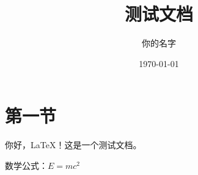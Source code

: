 \documentclass{article}
\begin{document}
\title{测试文档}
\author{你的名字}
\date{\today}
\maketitle

\section{第一节}
你好，LaTeX！这是一个测试文档。

数学公式：$E = mc^2$
\end{document}
